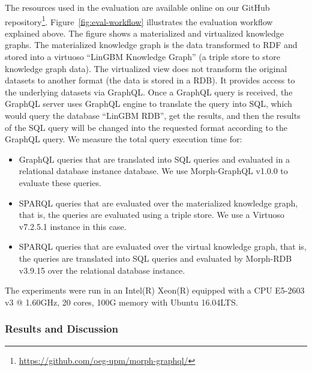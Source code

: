 The resources used in the evaluation are available online on our GitHub repository\footnote{\url{https://github.com/oeg-upm/morph-graphql/}}.
Figure~\ref{fig:eval-workflow} illustrates the evaluation workflow explained above. The figure shows a materialized and virtualized knowledge graphs. The materialized knowledge graph is the data transformed to RDF and stored into a virtuoso ``LinGBM Knowledge Graph'' (a triple store to store knowledge graph data).
The virtualized view does not transform the original datasets to another format (the data is stored in a RDB). It provides access to the underlying datasets via GraphQL. Once a GraphQL query is received, the GraphQL server uses GraphQL engine to translate the query into SQL, which would query the database ``LinGBM RDB'', get the results, and then the results of the SQL query will be changed into the requested format according to the GraphQL query. We measure the total query execution time for:
\begin{itemize}
    \item GraphQL queries that are translated into SQL queries and evaluated in a relational database instance database. We use Morph-GraphQL v1.0.0 to evaluate these queries.
    \item SPARQL queries that are evaluated over the materialized knowledge graph, that is, the queries are evaluated using a triple store. We use a Virtuoso v7.2.5.1 instance in this case.
    \item SPARQL queries that are evaluated over the virtual knowledge graph, that is, the queries are translated into SQL queries and evaluated by Morph-RDB v3.9.15 over the relational database instance. 
\end{itemize}
The experiments were run in an Intel(R) Xeon(R) equipped with a CPU E5-2603 v3 @ 1.60GHz, 20 cores, 100G memory with Ubuntu 16.04LTS.

\subsubsection{Results and Discussion}

